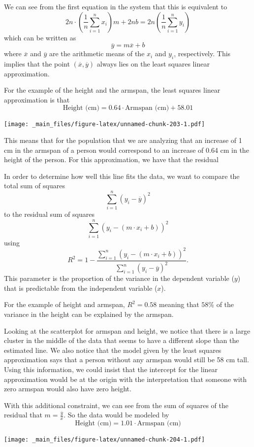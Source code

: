 \documentclass[
]{book}
\theoremstyle{definition}
\theoremstyle{definition}
\theoremstyle{definition}
\theoremstyle{definition}
\theoremstyle{remark}
\begin{document}
We can see from the first equation in the system that this is equivalent to
\[2n \cdot \left(\frac{1}{n}\sum_{i=1}^n x_i \right) m + 2n b = 2n \left(\frac{1}{n} \sum_{i=1}^n y_i \right)\] which can be written as \[\overline{y} = m \overline{x} +b\] where \(\overline{x}\) and \(\overline{y}\) are the arithmetic means of the \(x_i\) and \(y_i\), respectively. This implies that the point \((\overline{x},\overline{y})\) always lies on the least squares linear approximation.

For the example of the height and the armspan, the least squares linear approximation is that
\[\mbox{Height (cm)} = 0.64 \cdot \mbox{Armspan (cm)} + 58.01\]

\texttt{[image: \_main\_files/figure-latex/unnamed-chunk-203-1.pdf]}

This means that for the population that we are analyzing that an increase of 1 cm in the armspan of a person would correspond to an increase of 0.64 cm in the height of the person. For this approximation, we have that the residual

In order to determine how well this line fits the data, we want to compare the total sum of squares
\[\sum_{i=1}^n (y_i - \overline{y} )^2\] to the residual sum of squares \[\sum_{i=1}^n ( y_i - (m\cdot x_i +b))^2\] using
\[R^2 = 1 - \frac{\sum_{i=1}^n ( y_i - (m\cdot x_i +b))^2}{\sum_{i=1}^n (y_i - \overline{y} )^2}.\]
This parameter is the proportion of the variance in the dependent variable (\(y\)) that is predictable from the independent variable (\(x\)).

For the example of height and armspan, \(R^2= 0.58\) meaning that \(58\%\) of the variance in the height can be explained by the armspan.

Looking at the scatterplot for armspan and height, we notice that there is a large cluster in the middle of the data that seems to have a different slope than the estimated line. We also notice that the model given by the least squares approximation says that a person without any armspan would still be 58 cm tall. Using this information, we could insist that the intercept for the linear approximation would be at the origin with the interpretation that someone with zero armspan would also have zero height.

With this additional constraint, we can see from the sum of squares of the residual that \(m = \frac{\overline{y}}{\overline{x}}\). So the data would be modeled by
\[\mbox{Height (cm)} = 1.01 \cdot \mbox{Armspan (cm)} \]

\texttt{[image: \_main\_files/figure-latex/unnamed-chunk-204-1.pdf]}
\end{document}
